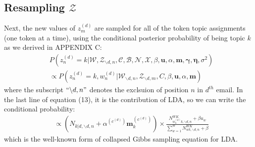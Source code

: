 \documentclass[a4paper]{article}
\begin{document}
 \subsection{Resampling $\mathcal{Z}$}
 Next, the new values of $z^{(d)}_m$ are sampled for all of the token topic assignments (one token at a time), using the conditional posterior probability of being topic $k$ as we derived in APPENDIX C:
 \begin{equation}
 \begin{aligned} & 
 P(z^{(d)}_n=k|\mathcal{W}, \mathcal{Z}_{\backslash d, n},  \mathcal{C}, \mathcal{B}, \mathcal{N}, \mathcal{X}, \beta, \boldsymbol{u}, \alpha, \boldsymbol{m}, \boldsymbol{\gamma}, \boldsymbol{\eta}, \sigma^2)\\
 & \propto P(z^{(d)}_n=k, w^{(d)}_n|\mathcal{W}_{\backslash d, n}, \mathcal{Z}_{\backslash d,m}, C, \beta, \boldsymbol{u}, \alpha, \boldsymbol{m})
 \end{aligned}
 \end{equation}
 where the subscript $``{\backslash d, n}"$ denotes the exclsuion of position $n$ in $d^{th}$ email. In the last line of equation (13), it is the contribution of LDA, so we can write the conditional probability:
 \begin{equation}
 \begin{aligned} 
 & \propto(N_{k|d, \backslash d, n}+\alpha^{(c^{(d)})} \boldsymbol{m}^{(c^{(d)})}_k)\times\frac{N_{w_n^{(d)}k, \backslash d, n}^{WK}+\beta u_w}{\sum_{w=1}^WN_{wk,  \backslash d, n}^{WK}+\beta}
 \end{aligned}
 \end{equation}
 which is the well-known form of collapsed Gibbs sampling equation for LDA.
\end{document}
